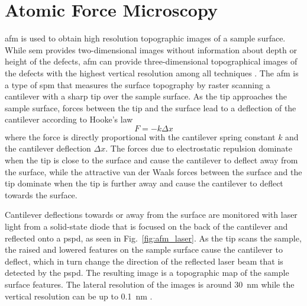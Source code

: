 \section{Atomic Force Microscopy}\label{sec:afm}
\Acf{afm} is used to obtain high resolution topographic images of a sample surface. While \ac{sem} provides two-dimensional images without information about depth or height of the defects, \ac{afm} can provide three-dimensional topographical images of the defects with the highest vertical resolution among all techniques \citep{smith2013industrial}. The \ac{afm} is a type of \ac{spm} that measures the surface topography by raster scanning a cantilever with a sharp tip over the sample surface. As the tip approaches the sample surface, forces between the tip and the surface lead to a deflection of the cantilever according to Hooke's law \citep{bhushan1998handbook}
\begin{equation}
F = -k\Delta x
\end{equation}
where the force is directly proportional with the cantilever spring constant $k$ and the cantilever deflection $\Delta x$. The forces due to electrostatic repulsion dominate when the tip is close to the surface and cause the cantilever to deflect away from the surface, while the attractive van der Waals forces between the surface and the tip dominate when the tip is further away and cause the cantilever to deflect towards the surface.

Cantilever deflections towards or away from the surface are monitored with laser light from a solid-state diode that is focused on the back of the cantilever and reflected onto a \ac{pspd}, as seen in Fig.~\ref{fig:afm_laser}. As the tip scans the sample, the raised and lowered features on the sample surface cause the cantilever to deflect, which in turn change the direction of the reflected laser beam that is detected by the \ac{pspd}. The resulting image is a topographic map of the sample surface features. The lateral resolution of the images is around \SI{30}{\nano\metre} while the vertical resolution can be up to \SI{0.1}{\nano\metre} \citep{birdi2003scanning}.




